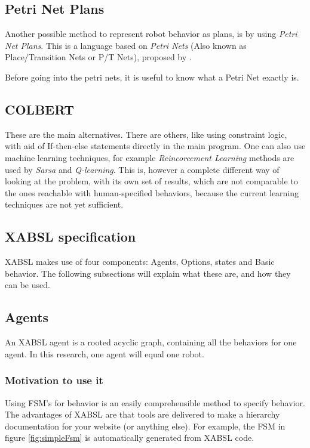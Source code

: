 \documentclass[a4paper,10pt]{article}
\begin{document}
\subsection{Petri Net Plans}
Another possible method to represent robot behavior as plans, is by using
\textit{Petri Net Plans}. This is a language based on \textit{Petri Nets} (Also known as
Place/Transition Nets or P/T Nets), proposed by \cite{ziparo2011petri}. 

Before going into the petri nets, it is useful to know what a Petri Net exactly
is. 

\subsection{COLBERT}
\cite{konolige1997colbert}

These are the main alternatives. There are others, like using constraint logic,
with aid of If-then-else statements directly in the main program. One can also
use machine learning techniques, for example \textit{Reincorcement Learning}
methods are used by \textit{Sarsa} and \textit{Q-learning}. This is, however a
complete different way of looking at the problem, with its own set of results,
which are not comparable to the ones reachable with human-specified behaviors,
because the current learning techniques are not yet sufficient.

\subsection{XABSL specification}
XABSL makes use of four components: Agents, Options, states and Basic behavior.
The following subsections will explain what these are, and how they can be used.

\subsection{Agents}
An XABSL agent is a rooted acyclic graph, containing all the behaviors for one
agent. In this research, one agent will equal one robot. 






\subsubsection{Motivation to use it}
Using FSM's for behavior is an easily comprehensible method to specify behavior.
The advantages of XABSL are that tools are delivered to make a hierarchy
documentation for your website (or anything else). For example, the FSM in
figure \ref{fig:simpleFsm} is automatically generated from XABSL code.
\end{document}
